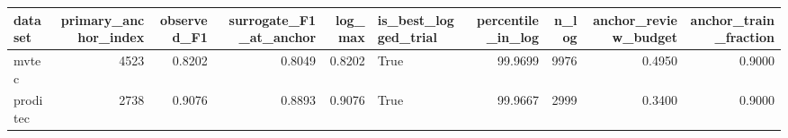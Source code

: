\begin{tabular}{lrrrrlrrrr}
\toprule
 dataset &  primary\_anchor\_index &  observed\_F1 &  surrogate\_F1\_at\_anchor &  log\_max &  is\_best\_logged\_trial &  percentile\_in\_log &  n\_log &  anchor\_review\_budget &  anchor\_train\_fraction \\
\midrule
   mvtec &                  4523 &       0.8202 &                  0.8049 &   0.8202 &                  True &            99.9699 &   9976 &                0.4950 &                 0.9000 \\
proditec &                  2738 &       0.9076 &                  0.8893 &   0.9076 &                  True &            99.9667 &   2999 &                0.3400 &                 0.9000 \\
\bottomrule
\end{tabular}
